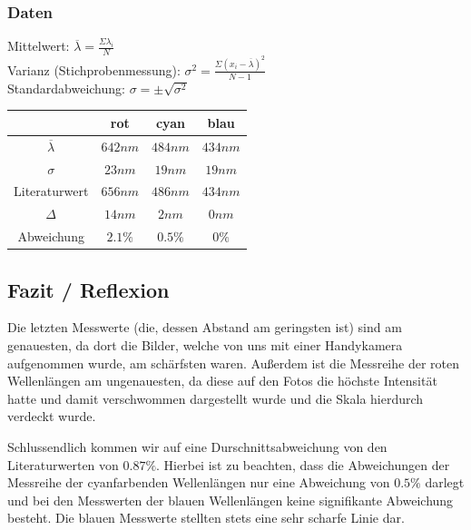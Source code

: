 \documentclass[12pt, a4paper]{article}
\begin{document}
\subsubsection{Daten}
\large
Mittelwert: $\overline{\lambda} = \frac{\Sigma \lambda_i}{N}$\\
Varianz (Stichprobenmessung): $\sigma^2 = \frac{\Sigma(x_i-\overline{\lambda})^2}{N-1}$\\
Standardabweichung: $\sigma = \pm \sqrt{\sigma^2}$
\normalsize

\vspace{5mm}

\begin{tabular}{ |c|c|c|c| }
    \hline
    & rot & cyan & blau \\
    \hline
    \hline
    $\overline{\lambda}$ & $642nm$ & $484nm$ & $434nm$ \\
    \hline
    $\sigma$ & $23nm$ & $19nm$ & $19nm$ \\
    \hline
    \hline
    Literaturwert & $656nm$ & $486nm$ & $434nm$ \\
    \hline
    $\Delta$ & $14nm$ & $2nm$ & $0nm$ \\
    \hline
    Abweichung & $2.1\%$ & $0.5\%$ & $0\%$ \\
    \hline
\end{tabular}

\newpage

\subsection{Fazit / Reflexion}
Die letzten Messwerte (die, dessen Abstand am geringsten ist) sind am genauesten,
da dort die Bilder, welche von uns mit einer Handykamera aufgenommen wurde,
am schärfsten waren.
Außerdem ist die Messreihe der roten Wellenlängen am ungenauesten,
da diese auf den Fotos die höchste Intensität hatte und damit
verschwommen dargestellt wurde und die Skala hierdurch verdeckt wurde.

Schlussendlich kommen wir auf eine Durschnittsabweichung von den Literaturwerten von $0.87\%$.
Hierbei ist zu beachten, dass die Abweichungen der Messreihe der cyanfarbenden
Wellenlängen nur eine Abweichung von $0.5\%$ darlegt und bei den Messwerten der
blauen Wellenlängen keine signifikante Abweichung besteht. Die blauen Messwerte
stellten stets eine sehr scharfe Linie dar.
\end{document}
